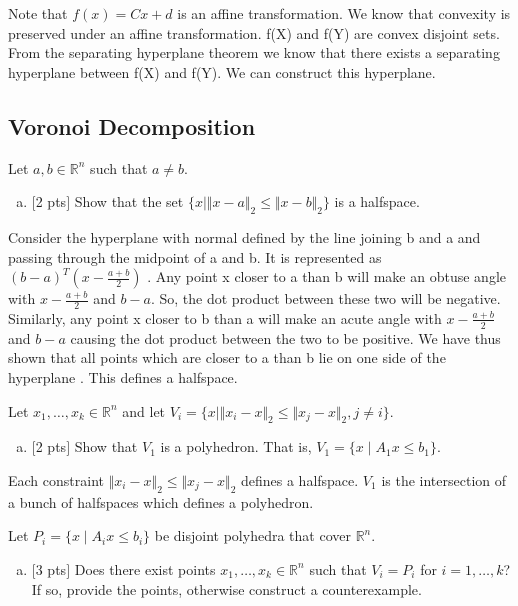 \documentclass[12pt]{article}
\begin{document}
Note that $f(x) = Cx + d$ is an affine transformation. We know that convexity is preserved under an affine transformation. f(X) and f(Y) are convex disjoint sets. From the separating hyperplane theorem we know that there exists a separating hyperplane between f(X) and f(Y). We can construct this hyperplane. 


\subsection{Voronoi Decomposition}

Let $a,b\in\mathbb{R}^n$ such that $a\ne b$.
\begin{enumerate}[(a)]
\item
$[$2 pts$]$  Show that the set $\{ x \mid \Vert x-a \Vert_2 \le \Vert x-b \Vert_2\}$ is a halfspace.
\end{enumerate}

Consider the hyperplane with normal defined by the line joining b and a and passing through the midpoint of a and b. It is represented as $(b-a)^T(x-\frac{a+b}{2})$ . Any point x closer to a than b will make an obtuse angle with $x-\frac{a+b}{2}$ and $b-a$. So, the dot product between these two will be negative. Similarly, any point x closer to b than a will make an acute angle with $x-\frac{a+b}{2}$ and $b-a$ causing the dot product between the two to be positive. We have thus shown that all points which are closer to a than b lie on one side of the hyperplane . This defines a halfspace. 

\vspace{.25cm} 

\noindent Let $x_1,\ldots,x_k\in\mathbb{R}^n$ and let $V_i = \{x \mid \Vert x_i-x \Vert_2 \le \Vert x_j-x \Vert_2, j\ne i \}$.
\begin{enumerate}[(b)]
\item
$[$2 pts$]$  Show that $V_1$ is a polyhedron.  That is, $V_1 = \{x \mid A_1x \le b_1\}$.
\end{enumerate}

Each constraint $\Vert x_i-x \Vert_2 \le \Vert x_j-x \Vert_2$ defines a halfspace. $V_1$ is the intersection of a bunch of halfspaces which defines a polyhedron. 

\vspace{.25cm}

\noindent Let $P_i = \{x \mid A_ix \le b_i\}$ be disjoint polyhedra that cover $\mathbb{R}^n$.
\begin{enumerate}[(c)]
\item
 $[$3 pts$]$  Does there exist points $x_1,\ldots,x_k\in\mathbb{R}^n$ such that $V_i = P_i$ for $i = 1,\ldots,k$?  If so, provide the points, otherwise construct a counterexample.
\end{enumerate}
\end{document}

